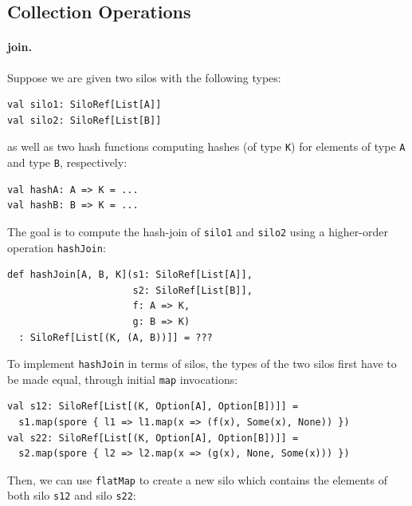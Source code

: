 \documentclass{jfp1}
\begin{document}

\subsection{Collection Operations}
\label{sec:dist-coll}

%

\paragraph{join.}

Suppose we are given two silos with the following types:

\begin{lstlisting}
val silo1: SiloRef[List[A]]
val silo2: SiloRef[List[B]]
\end{lstlisting}
\noindent
as well as two hash functions computing hashes (of type \verb|K|) for elements
of type \verb|A| and type \verb|B|, respectively:

\begin{lstlisting}
val hashA: A => K = ...
val hashB: B => K = ...
\end{lstlisting}
\noindent
The goal is to compute the hash-join of \verb|silo1| and \verb|silo2| using a
higher-order operation \verb|hashJoin|:

\begin{lstlisting}
def hashJoin[A, B, K](s1: SiloRef[List[A]],
                      s2: SiloRef[List[B]],
                      f: A => K,
                      g: B => K)
  : SiloRef[List[(K, (A, B))]] = ???
\end{lstlisting}
\noindent
To implement \verb|hashJoin| in terms of silos, the types of the two silos first
have to be made equal, through initial \verb|map| invocations:

\begin{lstlisting}
val s12: SiloRef[List[(K, Option[A], Option[B])]] =
  s1.map(spore { l1 => l1.map(x => (f(x), Some(x), None)) })
val s22: SiloRef[List[(K, Option[A], Option[B])]] =
  s2.map(spore { l2 => l2.map(x => (g(x), None, Some(x))) })
\end{lstlisting}
\noindent
Then, we can use \verb|flatMap| to create a new silo which contains the elements
of both silo \verb|s12| and silo \verb|s22|:
\end{document}
